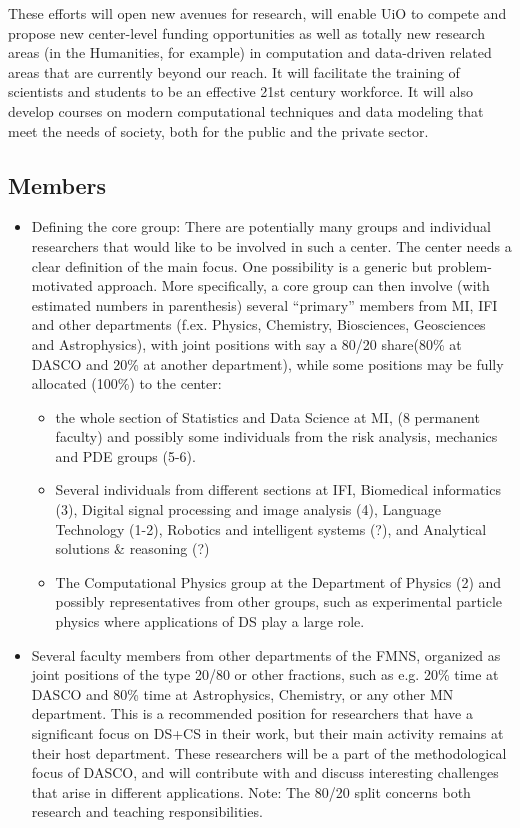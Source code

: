 \documentclass[a4paper,10pt]{article}
\begin{document}
These efforts will open new avenues for research, will enable UiO to
compete and propose new center-level funding opportunities as well as
totally new research areas (in the Humanities, for example) in
computation and data-driven related areas that are currently beyond
our reach. It will facilitate the training of scientists and students
to be an effective 21st century workforce. It will also develop
courses on modern computational techniques and data modeling that meet
the needs of society, both for the public and the private sector.





\subsection{Members}
\begin{itemize}
\item Defining the core group: There are potentially many groups and individual researchers that would like to be involved in such a center. The center needs a clear definition of the main focus. One possibility is a generic but problem-motivated approach. More specifically, a core group can then involve (with estimated numbers in parenthesis)
several “primary” members from MI, IFI and  other departments (f.ex. Physics, Chemistry, Biosciences, Geosciences and Astrophysics), with joint positions with say a 80/20 share(80\% at DASCO and 20\% at another department), while some positions may be fully allocated  (100\%) to the center:
\begin{itemize}
\item the whole section of Statistics and Data Science at MI, (8 permanent faculty) and possibly some individuals from the risk analysis, mechanics and PDE groups (5-6).
\item Several individuals from different sections at IFI, Biomedical informatics (3), Digital signal processing and image analysis (4), Language Technology (1-2), Robotics and intelligent systems (?), and Analytical solutions \& reasoning (?)
\item The Computational Physics group at the Department of Physics (2) and possibly representatives from other groups, such as experimental particle physics where applications of DS play a  large role.
\end{itemize}
\item Several faculty members from other  departments of the FMNS, organized as joint positions of the type 20/80 or other fractions, such as e.g. 20\% time at DASCO and 80\% time at Astrophysics, Chemistry, or any other MN department. This is a recommended position for researchers that have a significant  focus on DS+CS in their work, but their main activity remains  at their host department. These researchers will be a part of the methodological focus of DASCO, and will contribute with and discuss interesting challenges that arise in different applications. Note: The 80/20 split concerns both research and teaching responsibilities. 
\end{itemize}
\end{document}
